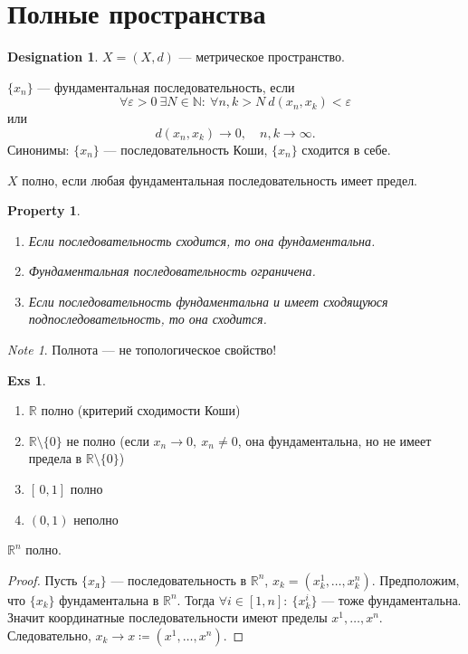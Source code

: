 \documentclass[11pt]{book}
\newcommand{\N}{\mathbb{N}}
\newcommand{\R}{\mathbb{R}}
\theoremstyle{definition}
\theoremstyle{plain}
\theoremstyle{plain}
\newtheorem*{prop}{Property}
\theoremstyle{definition}
\newtheorem*{exs}{Exs}
\newtheorem*{name}{Designation}
\theoremstyle{remark}
\newtheorem*{note}{Note}
\begin{document}
\section{Полные пространства}
\begin{name}
    $ X = (X, d)$ --- метрическое пространство.
\end{name}
\begin{defn}
    $ \{x_n\}$ --- фундаментальная последовательность, если \[
	\forall \varepsilon >0 ~ \exists N \in  \N: ~ \forall n, k > N ~ d(x_{n}, x_k) < \varepsilon
    \]
    или
    \[
	d(x_{n}, x_k ) \to  0, \quad n, k \to  \infty
    .\]
    Синонимы: $ \{x_{n}\}$ --- последовательность Коши, $ \{x_{n}\}$ сходится в себе.
\end{defn}
\begin{defn}
    $ X$ полно, если любая фундаментальная последовательность имеет предел.
\end{defn}
\begin{prop}
    $ $
    \begin{enumerate}
	\item Если последовательность сходится, то она фундаментальна.
	\item Фундаментальная последовательность ограничена.
	\item Если последовательность фундаментальна и имеет сходящуюся подпоследовательность, то она сходится.
    \end{enumerate}
\end{prop}
\begin{note}
    Полнота --- не топологическое свойство!
\end{note}
\begin{exs}
    $ $
    \begin{enumerate}
	\item $ \R $ полно (критерий сходимости Коши)
	\item $ \R \setminus \{0\}$ не полно (если $ x_{n} \to  0, ~ x_{n}\ne 0$, она фундаментальна, но не имеет предела в $ \R \setminus \{0\}$)
	\item $ [\,0, 1]$ полно
	\item $ (0, 1)$  неполно
    \end{enumerate}
\end{exs}
\begin{thm}
    $ \R^{n} $ полно.
\end{thm}
\begin{proof}
    Пусть $ \{x_{л}\}$ --- последовательность в $ \R^{n} $, $ x_k = (x_k^{1}, \ldots , x_k^{n})$.
    Предположим, что $ \{x_{k}\}$  фундаментальна в $ \R^{n} $. Тогда $ \forall  i \in [1, n]: ~ \{x_k^{i}\}$ --- тоже фундаментальна. Значит координатные последовательности имеют пределы $ x^{1}, \ldots , x^{n}$. Следовательно, $ x_k \to x \coloneqq (x^{1}, \ldots , x^{n})$.
\end{proof}
\end{document}
